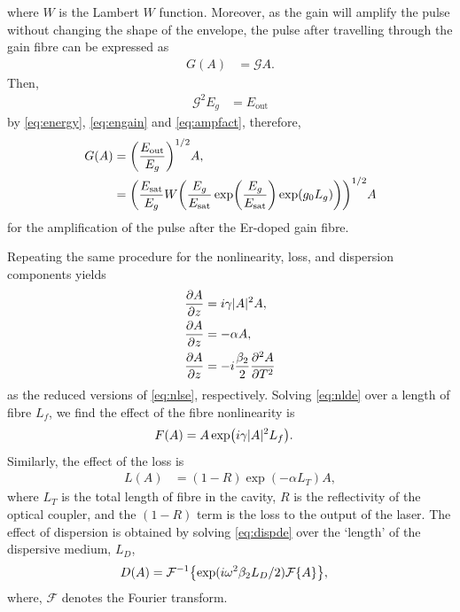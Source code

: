 \documentclass[9pt,twocolumn,twoside]{osajnl}
\let\originalleft\left
\let\originalright\right
\renewcommand{\left}{\mathopen{}\mathclose\bgroup\originalleft}
\renewcommand{\right}{\aftergroup\egroup\originalright}
\newcommand{\pdiff}[3][\hspace{-0.5pt}]{\frac{\partial^{#1}#2}{\partial{#3}^{#1}}} %
\newcommand{\Es}{E_{\textrm{sat}}} %
\newcommand{\FT}[1]{\mathcal{F}\left\{ #1 \right\}} %
\newcommand{\FTi}[1]{\mathcal{F}^{-1}\left\{ #1 \right\}} %
\begin{document}
where $W$ is the Lambert $W$ function. Moreover, as the gain will amplify the pulse without changing the shape of the envelope, the pulse after travelling through the gain fibre can be expressed as
\begin{align}
	G(A) &= \mathcal{G} A.
	\label{eq:ampfact}
\end{align}
Then,
\begin{align}
	\mathcal{G}^2 E_g &= E_\text{out}
\end{align}
by \eqref{eq:energy}, \eqref{eq:engain} and \eqref{eq:ampfact}, therefore,
\begin{align}
	G(A) &= \left( \frac{E_\text{out}}{E_g} \right)^{1/2} A, \\
	&=	\left( \frac{\Es}{E_g} W \left( \frac{E_g}{\Es} \exp \left( \frac{E_g}{\Es} \right) \exp( g_0 L_g ) \right) \right)^{1/2} A \label{eq:dimgain}
\end{align}
for the amplification of the pulse after the Er-doped gain fibre.

Repeating the same procedure for the nonlinearity, loss, and dispersion components yields
\begin{align}
	\pdiff{A}{z} &= i \gamma |A|^2 A, \label{eq:nlde} \\
	\pdiff{A}{z} &= - \alpha A,  \label{eq:lossde} \\
	\pdiff{A}{z} &= - i \frac{\beta_2}{2} \pdiff[2]{A}{T} \label{eq:dispde}
\end{align}
as the reduced versions of \eqref{eq:nlse}, respectively. Solving \eqref{eq:nlde} over a length of fibre $L_f$, we find the effect of the fibre nonlinearity is
\begin{align}
	F(A) &= A \exp \left( i \gamma |A|^2 L_f \right). \label{eq:dimnl}
\end{align}
Similarly, the effect of the loss is
\begin{align}
	L(A) &= (1 - R) \exp( - \alpha L_T )A, \label{eq:dimloss}
\end{align}
where $L_T$ is the total length of fibre in the cavity, $R$ is the reflectivity of the optical coupler, and the $(1 - R)$ term  is the loss to the output of the laser. The effect of dispersion is obtained by solving \eqref{eq:dispde} over the `length' of the dispersive medium, $L_D$,
\begin{align}
	D(A) &= \FTi{\exp( i \omega^2 \beta_2 L_D / 2 ) \FT{A}}, \label{eq:dimdisp}
\end{align}
where, $\mathcal{F}$ denotes the Fourier transform.
\end{document}
